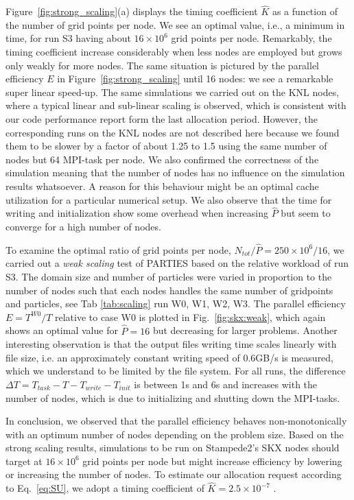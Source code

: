 \documentclass[10pt]{article}
\begin{document}
Figure~\ref{fig:strong_scaling}(a) displays the timing coefficient $\hat K$ as a function of the number of grid points per node.  We see an optimal value, i.e., a minimum in time, for run S3 having about $16 \times 10^6$ grid  points per node. %
 Remarkably, the  timing coefficient  increase  considerably when less nodes are employed but grows only weakly for more nodes. The same situation is pictured by the  parallel efficiency $E$  in Figure~\ref{fig:strong_scaling} until 16 nodes: we see a remarkable super linear speed-up. The same simulations we carried out on the KNL nodes, where a typical linear and sub-linear scaling is observed, which is consistent with  our code performance report form the last allocation period. However, the corresponding runs on the KNL nodes are not described here because we found them to be slower by a factor of about 1.25 to 1.5 using the same number of nodes but 64 MPI-task per node. We also confirmed the correctness of the simulation meaning that the number of nodes has no influence on the simulation results whatsoever. A reason for this behaviour might be an optimal cache utilization for a particular numerical setup. We also observe that the time for writing and initialization show some overhead when increasing $\hat P$ but seem to converge for a high number of nodes.



To examine the optimal ratio of grid points per node, $N_{tot}/\hat P =250 \times 10^6 / 16$, we carried out a \textit{weak scaling} test of PARTIES based on the relative workload of run S3. The domain size and number of particles were varied in proportion to the number of nodes such that each nodes handles the same number of gridpoints and particles, see  Tab \ref{tab:scaling} run W0, W1, W2, W3. The parallel efficiency $E= T^{W0}/T$ relative to case W0  is plotted in   Fig.~\ref{fig:skx:weak}, which again shows an optimal value for $\hat P =16$ but decreasing for larger problems. Another interesting observation is that the output files writing time scales linearly with file size, i.e. an approximately constant writing speed of 0.6GB/s is measured, which we understand to be limited by the file system.  For all runs, the difference $\Delta T = T_{task} - T - T_{write} -T_{init}$ is between 1s and 6s and increases with the number of nodes, which is due to initializing and shutting down the MPI-tasks.


In conclusion,  we observed that the parallel efficiency behaves non-monotonically  with an optimum number  of nodes  depending on the problem size. Based on the strong scaling results,  simulations to be run on Stampede2's SKX nodes  should target  at  $16 \times 10^6$  grid points per node but might increase efficiency by lowering or increasing the number of nodes. To estimate our allocation request according to Eq.~\ref{eq:SU}, we  adopt a timing coefficient of $\hat K = 2.5 \times 10^{-7}$ .
\end{document}
